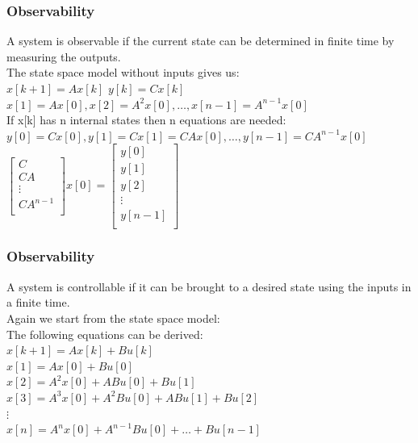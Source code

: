 \begin{frame}
	\frametitle{Observability}
	A system is observable if the current state can be determined in finite time by measuring the outputs.\\
	The state space model without inputs gives us:\\
	$x[k+1] = A x[k] $ 				$y[k]=Cx[k]$\\
	$x[1] = A x[0],x[2]  = A^2x[0],\dots , x[n-1] = A^{n-1} x[0]$\\
	If x[k] has n internal states then n equations are needed:\\
	$y[0] =Cx[0],y[1]=Cx[1]=CAx[0],\dots, y[n-1] = C A^{n-1} x[0]$\\
	$
	\begin{bmatrix}
		C\\
		CA\\
		\vdots\\
		CA^{n-1}\\
	\end{bmatrix}
	x[0]=
	\begin{bmatrix}
		y[0]\\
		y[1]\\
		y[2]\\
		\vdots \\
		y[n-1]\\
	\end{bmatrix}
	$
\end{frame}
\begin{frame}
	\frametitle{Observability}
	A system is controllable if it can be brought to a desired state using the inputs in a finite time.\\
	Again we start from the state space model:\\
	The following equations can be derived:\\
	$x[k+1] = A x[k] +Bu[k]$\\
	$x[1] = Ax[0]+Bu[0]$\\
	$x[2] = A^2 x[0] + ABu[0] + Bu[1]$\\
	$x[3] = A^3 x[0] + A^2Bu[0]+AB u[1] + Bu[2]$\\
	$\vdots$\\
	$x[n] = A^{n}x[0]+A^{n-1}Bu[0] + \dots + Bu[n-1]$
\end{frame}
